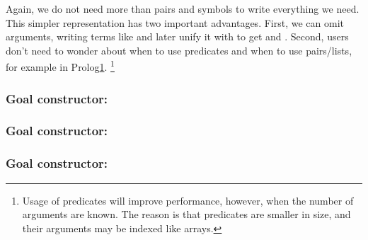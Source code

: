 Again, we do not need more than pairs and symbols to write everything we need. This simpler representation has two important advantages. First, we can omit arguments, writing terms like  and later unify it with  to get  and . Second, users don't need to wonder about when to use predicates and when to use pairs/lists, for example in Prolog\ref{pred-pair}. \footnote{\label{pred-pair}Usage of predicates will improve performance, however, when the number of arguments are known. The reason is that predicates are smaller in size, and their arguments may be indexed like arrays.}

\subsubsection{Goal constructor: }
\subsubsection{Goal constructor: }
\subsubsection{Goal constructor: }
